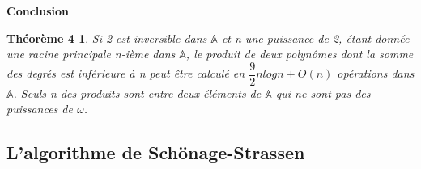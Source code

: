 \documentclass[a4paper]{article}
\begin{document}
\bigskip
\textbf{Conclusion}
\newtheorem*{thm4}{Théorème 4}
\begin{thm4}
    Si 2 est inversible dans $\mathbb{A}$ et n une puissance de 2, étant donnée une racine principale n-ième dans $\mathbb{A}$, le produit de deux polynômes dont la somme des degrés est inférieure à n peut être calculé en
    $\dfrac{9}{2}nlogn+O(n)$ opérations dans $\mathbb{A}$. Seuls n des produits sont entre deux éléments de $\mathbb{A}$ qui ne sont pas des puissances de $\omega$.
\end{thm4}

\bigskip
\subsection{L'algorithme de Schönage-Strassen}

\end{document}
